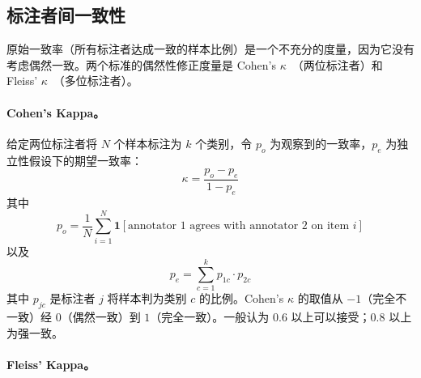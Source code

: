 \subsection{标注者间一致性}
\label{inter-annotator-agreement}

原始一致率（所有标注者达成一致的样本比例）是一个不充分的度量，因为它没有考虑偶然一致。两个标准的偶然性修正度量是 Cohen's $\kappa$~\cite{cohen1960coefficient}（两位标注者）和 Fleiss' $\kappa$~\cite{fleiss1971measuring}（多位标注者）。

\paragraph{Cohen's Kappa。}
\label{cohens-kappa.}

给定两位标注者将 $N$ 个样本标注为 $k$ 个类别，令 $p_o$ 为观察到的一致率，$p_e$ 为独立性假设下的期望一致率：
\begin{equation}
    \kappa = \frac{p_o - p_e}{1 - p_e}
\label{eq:cohens-kappa}
\end{equation}
其中
\begin{equation}
    p_o = \frac{1}{N}\sum_{i=1}^{N} \mathbf{1}[\text{annotator 1 agrees with annotator 2 on item } i]
\end{equation}
以及
\begin{equation}
    p_e = \sum_{c=1}^{k} p_{1c} \cdot p_{2c}
\end{equation}
其中 $p_{jc}$ 是标注者 $j$ 将样本判为类别 $c$ 的比例。Cohen's $\kappa$ 的取值从 $-1$（完全不一致）经 $0$（偶然一致）到 $1$（完全一致）。一般认为 $0.6$ 以上可以接受；$0.8$ 以上为强一致。

\paragraph{Fleiss' Kappa。}
\label{fleiss-kappa.}

